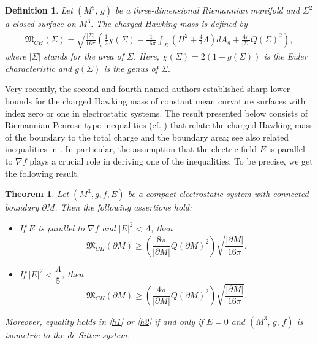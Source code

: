 \documentclass{amsart}
\newtheorem{theoremletter}{Theorem}
\newtheorem{definition}{Definition}
\numberwithin{equation}{section}
\begin{document}
\begin{definition}\label{hawkingmass}
Let $(M^3,\,g)$ be a three-dimensional Riemannian manifold and $\Sigma^2$ a closed surface on $M^3$. The charged Hawking mass is defined by
\begin{eqnarray*}
\mathfrak{M}_{CH}(\Sigma) = \sqrt{\frac{|\Sigma|}{16 \pi}}\left(\frac{1}{2}\chi(\Sigma) - \frac{1}{16\pi}\int_{\Sigma}(H^2 + \frac{4}{3}\Lambda)dA_{g} + \frac{4\pi}{|\Sigma|}Q(\Sigma)^2 \right),
\end{eqnarray*}
where $|\Sigma|$ stands for the area of $\Sigma$. Here, $\chi(\Sigma)=2(1-g(\Sigma))$ is the Euler characteristic and $g(\Sigma)$ is the genus of $\Sigma.$
\end{definition} 


Very recently, the second and fourth named authors \cite{leandro2025} established sharp lower bounds for the charged Hawking mass of constant mean curvature surfaces with index zero or one in electrostatic systems. The result presented below consists of Riemannian Penrose-type inequalities (cf. \cite{huisken2001}) that relate the charged Hawking mass of the boundary to the total charge and the boundary area; see also related inequalities in \cite{Jaracz,MKhuri}. In particular, the assumption that the electric field $E$ is parallel to $\nabla f$ plays a crucial role in deriving one of the inequalities. To be precise, we get the following result. 

		
\begin{theoremletter}\label{hawking2}
Let \((M^3, g, f, E)\) be a compact electrostatic system with connected boundary \(\partial M\). Then the following assertions hold:
\begin{itemize}
    \item[(i)] If \(E\) is parallel to \(\nabla f\) and \(|E|^{2} < \Lambda\), then
    \begin{equation}\label{h1}
        \mathfrak{M}_{CH}(\partial M) \geq \left( \frac{8\pi}{|\partial M|} Q(\partial M)^2 \right) \sqrt{\frac{|\partial M|}{16\pi}}.
    \end{equation}
    
    \item[(ii)] If \(|E|^{2} < \dfrac{\Lambda}{5}\), then
    \begin{equation}\label{h2}
        \mathfrak{M}_{CH}(\partial M) \geq \left( \frac{4\pi}{|\partial M|} Q(\partial M)^2 \right) \sqrt{\frac{|\partial M|}{16\pi}}.
    \end{equation}
\end{itemize} Moreover, equality holds in \eqref{h1} or \eqref{h2} if and only if \(E = 0\) and \((M^3,\, g,\, f)\) is isometric to the de Sitter system.
\end{theoremletter}
\end{document}
